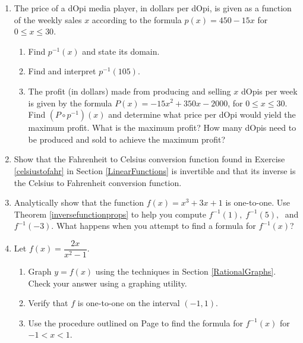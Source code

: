 \begin{enumerate}
\setcounter{enumi}{\value{HW}}

\item  The price of a dOpi media player, in dollars per dOpi, is given as a function of the weekly sales $x$ according to the formula $p(x) = 450-15x$ for $0 \leq x \leq 30$.

\begin{enumerate}

\item  Find $p^{-1}(x)$ and state its domain.

\item  Find and interpret $p^{-1}(105)$.

\item  The profit (in dollars) made from producing and selling $x$ dOpis per week is given by the formula $P(x)= -15x^2+350x-2000$, for $0 \leq x \leq 30$.  Find $\left(P \circ p^{-1}\right)(x)$ and determine what price per dOpi would yield the maximum profit.  What is the maximum profit?  How many dOpis need to be produced and sold to achieve the maximum profit?
\end{enumerate}

\item Show that the Fahrenheit to Celsius conversion function found in Exercise \ref{celsiustofahr} in Section \ref{LinearFunctions} is invertible and that its inverse is the Celsius to Fahrenheit conversion function.

\item Analytically show that the function $f(x) = x^3 + 3x + 1$ is one-to-one.  Use Theorem \ref{inversefunctionprops} to help you compute $f^{-1}(1), \; f^{-1}(5), \;$ and $f^{-1}(-3)$.  What happens when you attempt to find a formula for $f^{-1}(x)$?


\item  Let $f(x) = \dfrac{2x}{x^2-1}$.  

\begin{enumerate}

\item  Graph $y = f(x)$ using the techniques  in Section \ref{RationalGraphs}.  Check your answer using a graphing utility.

\item Verify that $f$ is one-to-one on the interval $(-1,1)$.  

\item Use the procedure outlined on Page \pageref{inverseprocedure} to find the formula for $f^{-1}(x)$ for $-1 < x < 1$.


\end{enumerate}
\end{enumerate}
